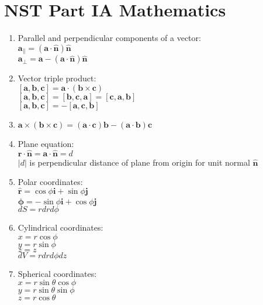 \documentclass[fleqn]{article}
\author{Victor Zhao\\xz398@cam.ac.uk}
\begin{document}
\centering
\section*{NST Part IA Mathematics}
\MyAuthor

\begin{enumerate}
    \item Parallel and perpendicular components of a vector:\\
        $\mathbf{a}_\parallel=(\mathbf{a}\cdot\mathbf{\hat{n}})\mathbf{\hat{n}}$\\
        $\mathbf{a}_\perp=\mathbf{a}-(\mathbf{a}\cdot\mathbf{\hat{n}})\mathbf{\hat{n}}$
    \item Vector triple product:\\
        $[\mathbf{a},\mathbf{b},\mathbf{c}]=\mathbf{a}\cdot(\mathbf{b}\times\mathbf{c})$\\
        $[\mathbf{a},\mathbf{b},\mathbf{c}]=[\mathbf{b},\mathbf{c},\mathbf{a}]=[\mathbf{c},\mathbf{a},\mathbf{b}]$\\
        $[\mathbf{a},\mathbf{b},\mathbf{c}]=-[\mathbf{a},\mathbf{c},\mathbf{b}]$
    \item $\mathbf{a}\times(\mathbf{b}\times\mathbf{c})=(\mathbf{a}\cdot\mathbf{c})\mathbf{b}-(\mathbf{a}\cdot\mathbf{b})\mathbf{c}$
    \item Plane equation:\\
        $\mathbf{r}\cdot\mathbf{\hat{n}}=\mathbf{a}\cdot\mathbf{\hat{n}}=d$\\
        $|$$d$$|$ is perpendicular distance of plane from origin for unit normal $\mathbf{\hat{n}}$
    \item Polar coordinates:\\
        $\mathbf{\hat{r}}=\cos\phi\mathbf{i}+\sin\phi\mathbf{j}$\\
        $\mathbf{\hat{\phi}}=-\sin\phi\mathbf{i}+\cos\phi\mathbf{j}$\\
        $dS=rdrd\phi$
    \item Cylindrical coordinates:\\
        $x=r\cos\phi$\\
        $y=r\sin\phi$\\
        $z=z$\\
        $dV=rdrd\phi dz$
    \item Spherical coordinates:\\
        $x=r\sin\theta\cos\phi$\\
        $y=r\sin\theta\sin\phi$\\
        $z=r\cos\theta$\smallbreak

\end{enumerate}
\end{document}
